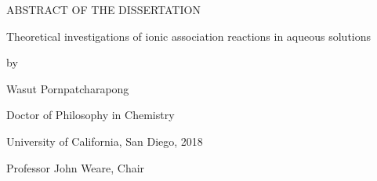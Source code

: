 \newpage

\begingroup
\vspace*{1.5in}
\begin{center}
    {ABSTRACT OF THE DISSERTATION}
\end{center}
\endgroup

\vspace{1.2cm}

\begin{center}
    Theoretical investigations of ionic association reactions in aqueous solutions

    \vspace{0.6cm}

    by

    \vspace{0.6cm}

    \begin{spacing}{1.0}
        Wasut Pornpatcharapong

        Doctor of Philosophy in Chemistry

        University of California, San Diego, 2018
    \end{spacing}

    \vspace{0.6cm}

    Professor John Weare, Chair
\end{center}

\vspace{0.6cm}

\begin{spacing}{2.0}
    \lipsum[1-3]
\end{spacing}
